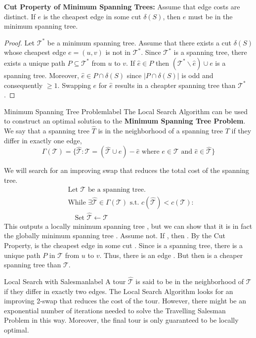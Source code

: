\begin{marginfigure}
	\textbf{Cut Property of Minimum Spanning Trees:} Assume that edge costs are distinct. If $e$ is the cheapest edge in some cut $\delta(S)$, then $e$ must be in the minimum spanning tree.

	\begin{proof}
		Let $\mathcal{T}^*$ be a minimum spanning tree. Assume that there exists a cut $\delta(S)$ whose cheapest edge $e = (u,v)$ is not in $\mathcal{T}^*$. Since $\mathcal{T}^*$ is a spanning tree, there exists a unique path $P \subseteq \mathcal{T}^*$ from $u$ to $v$. If $\hat{e} \in P$ then $\left(\mathcal{T}^* \backslash \hat{e}\right) \cup e$ is a spanning tree. Moreover, $\hat{e} \in P \cap \delta(S)$ since $|P \cap \delta(S)|$ is odd and consequently $\geq 1$. Swapping $e$ for $\hat{e}$ results in a cheapter spanning tree than $\mathcal{T}^*$.
	\end{proof}
\end{marginfigure}

\begin{ex}{Minimum Spanning Tree Problem}{label}
	The Local Search Algorithm can be used to construct an optimal solution to the \textbf{Minimum Spanning Tree Problem}. We say that a spanning tree $\hat{T}$ is in the neighborhood of a spanning tree $T$ if they differ in exactly one edge,
	\[\Gamma(\mathcal{T})=\{\hat{\mathcal{T}}: \mathcal{T}=(\hat{\mathcal{T}} \cup e) - \hat{e} \text{ where } e \in \mathcal{T} \text{ and } \hat{e} \in \hat{\mathcal{T}}\}\]
	
	We will search for an improving swap that reduces the total cost of the spanning tree.
	\begin{align*}
		&\text{Let $\mathcal{T}$ be a spanning tree.} \\
		&\text{While $\exists \hat{\mathcal{T}} \in \Gamma(\mathcal{T})$ s.t. $c(\mathcal{\hat{T}}) < c(\mathcal{T})$}: \\
		&\quad \text{Set $\hat{\mathcal{T}} \leftarrow \mathcal{T}$}
	\end{align*}
	This outputs a locally minimum spanning tree , but we can show that it is in fact the globally minimum spanning tree . Assume not. If , then . By the Cut Property,  is the cheapest edge in some cut . Since  is a spanning tree, there is a unique path $P$ in $\mathcal{T}$ from $u$ to $v$. Thus, there is an edge . But then  is a cheaper spanning tree than $\mathcal{T}$.
\end{ex}

\begin{ex}{Local Search with Salesman}{label}
	A tour $\hat{\mathcal{T}}$ is said to be in the neighborhood of $\mathcal{T}$ if they differ in exactly two edges. The Local Search Algorithm looks for an improving 2-swap that reduces the cost of the tour. However, there might be an exponential number of iterations needed to solve the Travelling Salesman Problem in this way. Moreover, the final tour is only guaranteed to be locally optimal. 
\end{ex}